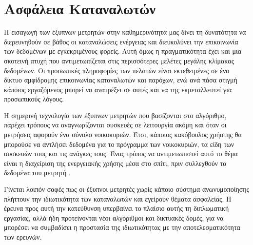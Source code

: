 \section{Ασφάλεια Καταναλωτών}
Η εισαγωγή των έξυπνων μετρητών στην καθημερινότητά μας δίνει τη δυνατότητα να διερευνηθούν σε βάθος οι καταναλώσεις ενέργειας και διευκολύνει την επικοινωνία των δεδομένων με εγκεκριμένους φορείς. Αυτή όμως η πραγματικότητα έχει και μια σκοτεινή πτυχή που αντιμετωπίζεται στις περισσότερες μελέτες μεγάλης κλίμακας δεδομένων. Οι προσωπικές πληροφορίες των πελατών είναι εκτεθειμένες σε ένα δίκτυο αμφίδρομης επικοινωνίας καταναλωτών και παρόχων, ενώ ανά πάσα στιγμή κάποιος εργαζόμενος μπορεί να ανατρέξει σε αυτές και να της εκμεταλλευτεί για προσωπικούς λόγους.\par
Η σημερινή τεχνολογία των έξυπνων μετρητών που βασίζονται στο  αλγόριθμο, παρέχει τρόπους να αναγνωρίζονται συσκευές σε λειτουργία ακόμη και όταν οι μετρήσεις αφορούν ένα σύνολο νοικοκυριών. Έτσι, κάποιος κακόβουλος χρήστης θα μπορούσε να αντλήσει δεδομένα για το πρόγραμμα των νοικοκυριών, τα είδη των συσκευών τους και τις ανάγκες τους. Ένας τρόπος να αντιμετωπιστεί αυτό το θέμα είναι η διαχείριση της ενεργειακής χρήσης μέσα στο σπίτι, πριν συλλεχθούν τα δεδομένα του μετρητή \cite{anonymization}.\par
Γίνεται λοιπόν σαφές πως οι έξυπνοι μετρητές χωρίς κάποιο σύστημα ανωνυμοποίησης πλήττουν την ιδιωτικότητα των καταναλωτών και εγείρουν θέματα ασφαλείας. Η έρευνα προς αυτή την κατεύθυνση υπερβαίνει το πλαίσιο αυτής τη διπλωματική εργασίας, αλλά ήδη προτείνονται νέοι αλγόριθμοι και δικτυακές δομές, για να μπορέσει να συμβαδίσει η προστασία της ιδιωτικότητας με την αποτελεσματικότητα των ερευνών.

